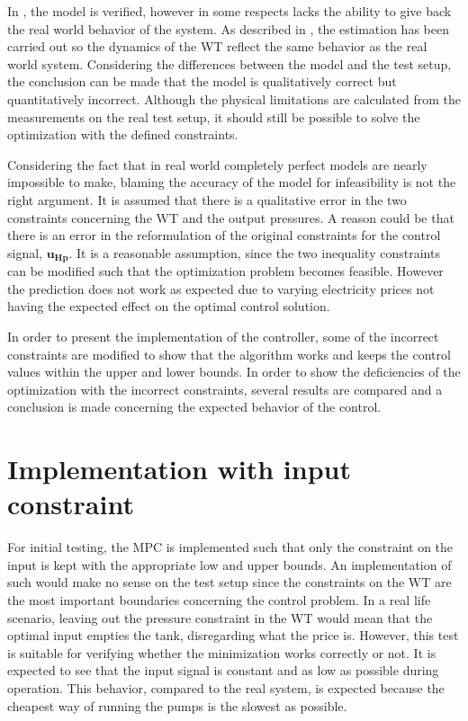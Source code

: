 In , the model is verified, however in some respects lacks the ability to give back the real world behavior of the system. As described in , the estimation has been carried out so the dynamics of the WT reflect the same behavior as the real world system. Considering the differences between the model and the test setup, the conclusion can be made that the model is qualitatively correct but quantitatively incorrect. Although the physical limitations are calculated from the measurements on the real test setup, it should still be possible to solve the optimization with the defined constraints.

 Considering the fact that in real world completely perfect models are nearly impossible to make, blaming the accuracy of the model for infeasibility is not the right argument. It is assumed that there is a qualitative error in the two constraints concerning the WT and the output pressures. A  reason could be that there is an error in the reformulation of the original constraints for the control signal, $\bm{u_{Hp}}$. It is a reasonable assumption, since the two inequality constraints can be modified such that the optimization problem becomes feasible. However the prediction does not work as expected due to varying electricity prices not having the expected effect on the optimal control solution.

In order to present the implementation of the controller, some of the incorrect constraints are modified to show that the algorithm works and keeps the control values within the upper and lower bounds. In order to show the deficiencies of the optimization with the incorrect constraints, several results are compared and a conclusion is made concerning the expected behavior of the control. 

\section{Implementation with input constraint}
\label{input constraint}

For initial testing, the MPC is implemented such that only the constraint on the input is kept with the appropriate low and upper bounds. An implementation of such would make no sense on the test setup since the constraints on the WT are the most important boundaries concerning the control problem. In a real life scenario, leaving out the pressure constraint in the WT would mean that the optimal input empties the tank, disregarding what the price is. However, this test is suitable for verifying whether the minimization works correctly or not. It is expected to see that the input signal is constant and as low as possible during operation. This behavior, compared to the real system, is expected because the cheapest way of running the pumps is the slowest as possible. 

